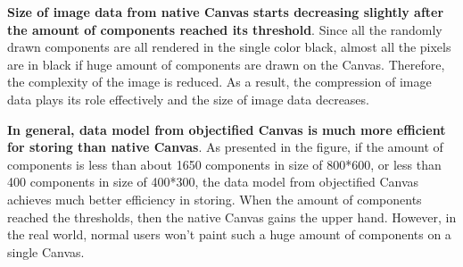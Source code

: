 \textbf{Size of image data from native Canvas starts decreasing slightly after the amount of components reached its threshold}. Since all the randomly drawn components are all rendered in the single color black, almost all the pixels are in black if huge amount of components are drawn on the Canvas. Therefore, the complexity of the image is reduced. As a result, the compression of image data plays its role effectively and the size of image data decreases.

\textbf{In general, data model from objectified Canvas is much more efficient for storing than native Canvas}. As presented in the figure, if the amount of components is less than about 1650 components in size of 800*600, or less than 400 components in size of 400*300, the data model from objectified Canvas achieves much better efficiency in storing. When the amount of components reached the thresholds, then the native Canvas gains the upper hand. However, in the real world, normal users won't paint such a huge amount of components on a single Canvas.